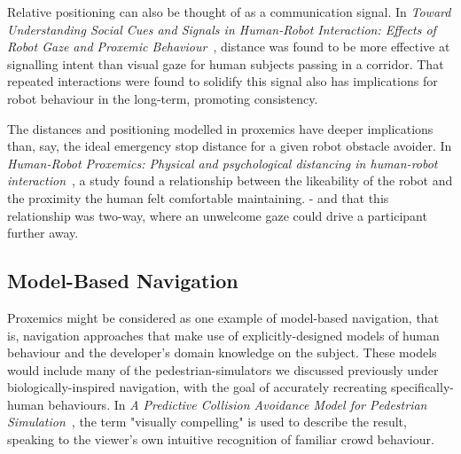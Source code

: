\documentclass{sfuthesis}
\begin{document}
Relative positioning can also be thought of as a communication signal. In \textit{Toward Understanding Social Cues and Signals in Human-Robot Interaction: Effects of Robot Gaze and Proxemic Behaviour}~\cite{fiore2013toward}, distance was found to be more effective at signalling intent than visual gaze for human subjects passing in a corridor. That repeated interactions were found to solidify this signal also has implications for robot behaviour in the long-term, promoting consistency.

The distances and positioning modelled in proxemics have deeper implications than, say, the ideal emergency stop distance for a given robot obstacle avoider. In \textit{Human-Robot Proxemics: Physical and psychological distancing in human-robot interaction}~\cite{mumm2011human}, a study found a relationship between the likeability of the robot and the proximity the human felt comfortable maintaining. - and that this relationship was two-way, where an unwelcome gaze could drive a participant further away.




\subsection{Model-Based Navigation}

Proxemics might be considered as one example of model-based navigation, that is, navigation approaches that make use of explicitly-designed models of human behaviour and the developer's domain knowledge on the subject. These models would include many of the pedestrian-simulators we discussed previously under biologically-inspired navigation, with the goal of accurately recreating specifically-human behaviours. In \textit{A Predictive Collision Avoidance Model for Pedestrian Simulation}~\cite{karamouzas2009predictive}, the term "visually compelling" is used to describe the result, speaking to the viewer's own intuitive recognition of familiar crowd behaviour.
\end{document}
